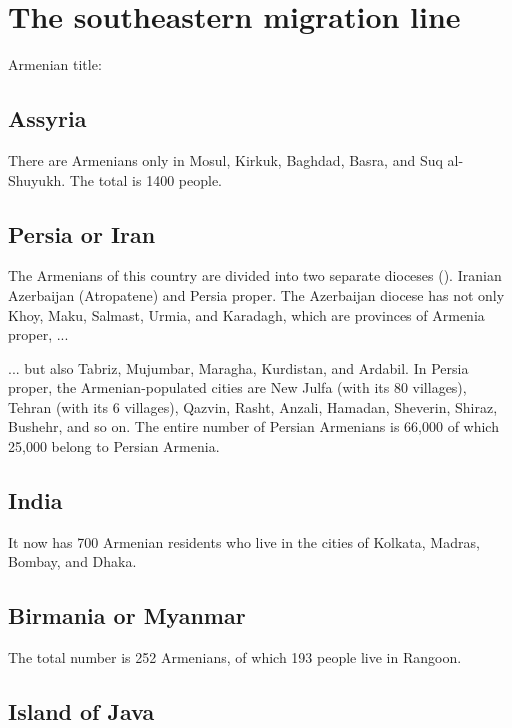 \section{The southeastern migration line}

Armenian title: 

\subsection{Assyria}

There are Armenians only in Mosul, Kirkuk, Baghdad, Basra, and Suq al-Shuyukh. The total is 1400 people.

\subsection{Persia or Iran}


The Armenians of this country are divided into two separate dioceses (). Iranian Azerbaijan (Atropatene) and Persia proper. The Azerbaijan diocese has not only Khoy, Maku, Salmast, Urmia, and Karadagh, which are provinces of Armenia proper, ... 

\begin{adjarianpage}\label{page:28}\end{adjarianpage}%

... but also Tabriz, Mujumbar, Maragha, Kurdistan, and Ardabil. In Persia proper, the Armenian-populated cities are New Julfa (with its 80 villages), Tehran (with its 6 villages), Qazvin, Rasht, Anzali, Hamadan, Sheverin, Shiraz, Bushehr, and so on. The entire number of Persian Armenians is 66,000 of which 25,000 belong to Persian Armenia. 

\subsection{India}

It now has 700 Armenian residents who live in the cities of Kolkata, Madras, Bombay, and Dhaka. 

\subsection{Birmania or Myanmar}

The total number is 252 Armenians, of which 193 people live in Rangoon.

\subsection{Island of Java}

